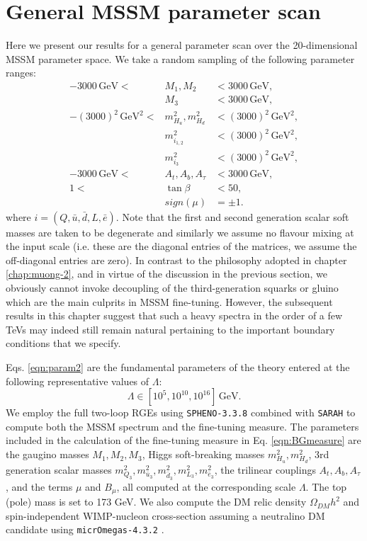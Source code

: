 \section{General MSSM parameter scan}
\label{sec:generalscan}

Here we present our results for a general parameter scan over the 20-dimensional MSSM parameter space. We take a random sampling of the following parameter ranges:
\begin{eqnarray}
-3000\,\text{GeV} <& M_1,M_2 &< 3000\,\text{GeV}, \nonumber \\
&M_3 &< 3000\,\text{GeV}, \nonumber \\
-(3000)^2\,\text{GeV}^2 <& m^2_{H_u},m^2_{H_d} &< (3000)^2\,\text{GeV}^2, \nonumber \\
& m^2_{i_{1,2}} &< (3000)^2\,\text{GeV}^2, \nonumber \\
& m^2_{i_3} &< (3000)^2\,\text{GeV}^2, \nonumber \\
-3000\,\text{GeV} <& A_t,A_b,A_{\tau} &< 3000\,\text{GeV}, \nonumber \\
1 <& \tan \beta &< 50, \nonumber \\
&sign(\mu)&=\pm 1.
\label{eqn:param2}
\end{eqnarray}
where $i=(Q,\bar{u},\bar{d},L,\bar{e})$. Note that the first and second generation scalar soft masses are taken to be degenerate and similarly we assume no flavour mixing at the input scale (i.e. these are the diagonal entries of the matrices, we assume the off-diagonal entries are zero). In contrast to the philosophy adopted in chapter \ref{chap:muong-2}, and in virtue of the discussion in the previous section, we obviously cannot invoke decoupling of the third-generation squarks or gluino which are the main culprits in MSSM fine-tuning. However, the subsequent results in this chapter suggest that such a heavy spectra in the order of a few TeVs may indeed still remain natural pertaining to the important boundary conditions that we specify.

Eqs. \ref{eqn:param2} are the fundamental parameters of the theory entered at the following representative values of $\Lambda$:
\begin{equation}
\Lambda \in \left[10^5,10^{10},10^{16} \right]\,\text{GeV}.
\end{equation}
We employ the full two-loop RGEs using \texttt{SPHENO-3.3.8} \cite{RN178} combined with \texttt{SARAH} \cite{RN310} to compute both the MSSM spectrum and the fine-tuning measure. The parameters included in the calculation of the fine-tuning measure in Eq. \ref{eqn:BGmeasure} are the gaugino masses $M_1,M_2,M_3$, Higgs soft-breaking masses $m^2_{H_u},m^2_{H_d}$, 3rd generation scalar masses $m^2_{Q_3},m^2_{\bar{u}_3},m^2_{\bar{d}_3},m^2_{L_3},m^2_{\bar{e}_3}$, the trilinear couplings $A_t,A_b,A_{\tau}$, and the terms $\mu$ and $B_{\mu}$, all computed at the corresponding scale $\Lambda$. The top (pole) mass is set to 173 GeV. We also compute the DM relic density $\Omega_{DM} h^2$ and spin-independent WIMP-nucleon cross-section assuming a neutralino DM candidate using \texttt{micrOmegas-4.3.2} \cite{RN621}.

